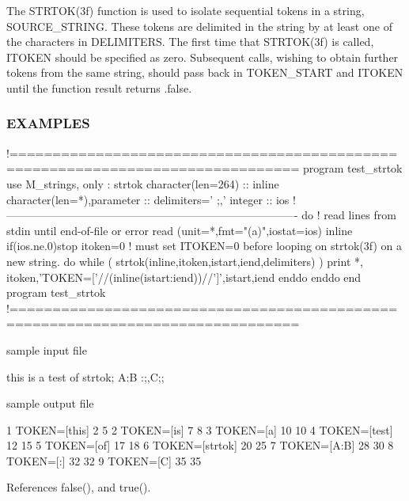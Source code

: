 The S\+T\+R\+T\+O\+K(3f) function is used to isolate sequential tokens in a string, S\+O\+U\+R\+C\+E\+\_\+\+S\+T\+R\+I\+NG. These tokens are delimited in the string by at least one of the characters in D\+E\+L\+I\+M\+I\+T\+E\+RS. The first time that S\+T\+R\+T\+O\+K(3f) is called, I\+T\+O\+K\+EN should be specified as zero. Subsequent calls, wishing to obtain further tokens from the same string, should pass back in T\+O\+K\+E\+N\+\_\+\+S\+T\+A\+RT and I\+T\+O\+K\+EN until the function result returns .false. \subsubsection*{E\+X\+A\+M\+P\+L\+ES}

\begin{DoxyVerb} !===============================================================================
 program test_strtok
 use M_strings, only : strtok
 character(len=264)          :: inline
 character(len=*),parameter  :: delimiters=' ;,'
 integer                     :: ios
 !-------------------------------------------------------------------------------
    do                        ! read lines from stdin until end-of-file or error
       read (unit=*,fmt="(a)",iostat=ios) inline
       if(ios.ne.0)stop
       itoken=0 ! must set ITOKEN=0 before looping on strtok(3f) on a new string.
       do while ( strtok(inline,itoken,istart,iend,delimiters) )
          print *, itoken,'TOKEN=['//(inline(istart:iend))//']',istart,iend
       enddo
    enddo
 end program test_strtok
 !===============================================================================

 sample input file

  this is a test of strtok; A:B :;,C;;

 sample output file

 1  TOKEN=[this]    2   5
 2  TOKEN=[is]      7   8
 3  TOKEN=[a]       10  10
 4  TOKEN=[test]    12  15
 5  TOKEN=[of]      17  18
 6  TOKEN=[strtok]  20  25
 7  TOKEN=[A:B]     28  30
 8  TOKEN=[:]       32  32
 9  TOKEN=[C]       35  35 \end{DoxyVerb}
 

References false(), and true().

